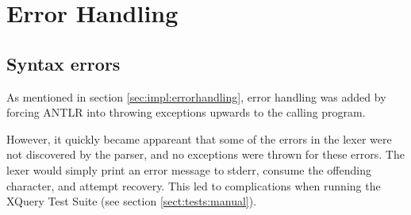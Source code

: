 \section{Error Handling}
\subsection{Syntax errors}
\label{sect:error_handling:syntax_errors}
As mentioned in section \ref{sec:impl:errorhandling}, error handling was added
by forcing ANTLR into throwing exceptions upwards to the calling program.

However, it quickly became appareant that some of the errors in the lexer were
not discovered by the parser, and no exceptions were thrown for these errors. The
lexer would simply print an error message to stderr, consume the offending
character, and attempt recovery. This led to complications when running the
XQuery Test Suite (see section \ref{sect:tests:manual}).

